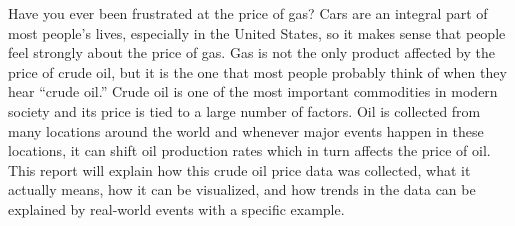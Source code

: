Have you ever been frustrated at the price of gas? Cars are an integral part of most people’s lives, especially in the United States, so it makes sense that people feel strongly about the price of gas. Gas is not the only product affected by the price of crude oil, but it is the one that most people probably think of when they hear “crude oil.” Crude oil is one of the most important commodities in modern society and its price is tied to a large number of factors. Oil is collected from many locations around the world and whenever major events happen in these locations, it can shift oil production rates which in turn affects the price of oil. This report will explain how this crude oil price data was collected, what it actually means, how it can be visualized, and how trends in the data can be explained by real-world events with a specific example.
